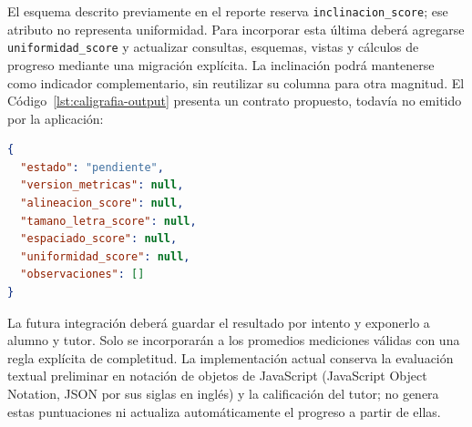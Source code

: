 El esquema descrito previamente en el reporte reserva \texttt{inclinacion\_score}; ese atributo no representa uniformidad. Para incorporar esta última deberá agregarse \texttt{uniformidad\_score} y actualizar consultas, esquemas, vistas y cálculos de progreso mediante una migración explícita. La inclinación podrá mantenerse como indicador complementario, sin reutilizar su columna para otra magnitud. El Código~\ref{lst:caligrafia-output} presenta un contrato propuesto, todavía no emitido por la aplicación:
\begin{lstlisting}[language=JSON, caption={Contrato propuesto para métricas pendientes de implementación}, label={lst:caligrafia-output}]
{
  "estado": "pendiente",
  "version_metricas": null,
  "alineacion_score": null,
  "tamano_letra_score": null,
  "espaciado_score": null,
  "uniformidad_score": null,
  "observaciones": []
}
\end{lstlisting}

La futura integración deberá guardar el resultado por intento y exponerlo a alumno y tutor. Solo se incorporarán a los promedios mediciones válidas con una regla explícita de completitud. La implementación actual conserva la evaluación textual preliminar en notación de objetos de JavaScript (JavaScript Object Notation, JSON por sus siglas en inglés) y la calificación del tutor; no genera estas puntuaciones ni actualiza automáticamente el progreso a partir de ellas.
